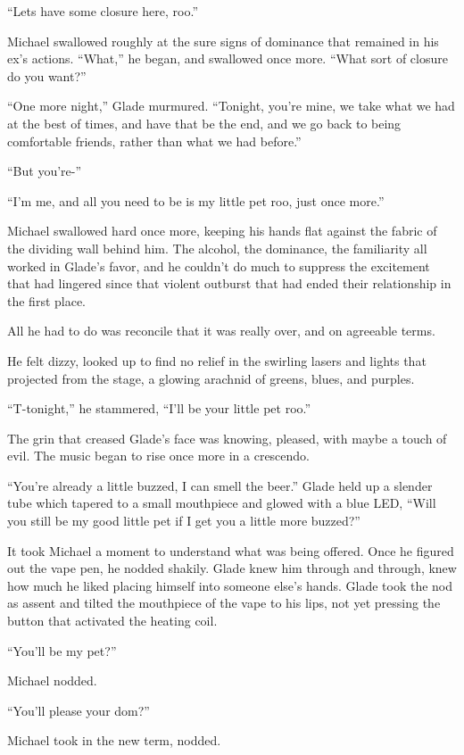 ``Lets have some closure here, roo.''

Michael swallowed roughly at the sure signs of dominance that remained in his ex's actions. ``What,'' he began, and swallowed once more. ``What sort of closure do you want?''

``One more night,'' Glade murmured. ``Tonight, you're mine, we take what we had at the best of times, and have that be the end, and we go back to being comfortable friends, rather than what we had before.''

``But you're-''

``I'm me, and all you need to be is my little pet roo, just once more.''

Michael swallowed hard once more, keeping his hands flat against the fabric of the dividing wall behind him. The alcohol, the dominance, the familiarity all worked in Glade's favor, and he couldn't do much to suppress the excitement that had lingered since that violent outburst that had ended their relationship in the first place.

All he had to do was reconcile that it was really over, and on agreeable terms.

He felt dizzy, looked up to find no relief in the swirling lasers and lights that projected from the stage, a glowing arachnid of greens, blues, and purples.

``T-tonight,'' he stammered, ``I'll be your little pet roo.''

The grin that creased Glade's face was knowing, pleased, with maybe a touch of evil. The music began to rise once more in a crescendo.

``You're already a little buzzed, I can smell the beer.'' Glade held up a slender tube which tapered to a small mouthpiece and glowed with a blue LED, ``Will you still be my good little pet if I get you a little more buzzed?''

It took Michael a moment to understand what was being offered. Once he figured out the vape pen, he nodded shakily. Glade knew him through and through, knew how much he liked placing himself into someone else's hands. Glade took the nod as assent and tilted the mouthpiece of the vape to his lips, not yet pressing the button that activated the heating coil.

``You'll be my pet?''

Michael nodded.

``You'll please your dom?''

Michael took in the new term, nodded.

